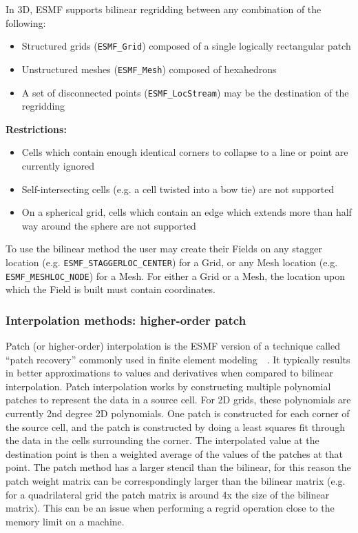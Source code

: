 \smallskip

 In 3D, ESMF supports bilinear regridding between any combination of the following:
 \begin{itemize}
 \item Structured grids ({\tt ESMF\_Grid}) composed of a single logically rectangular patch
 \item Unstructured meshes ({\tt ESMF\_Mesh}) composed of hexahedrons 
 \item A set of disconnected points ({\tt ESMF\_LocStream}) may be the destination of the regridding
 \end{itemize}

\smallskip

{\bf Restrictions:}
 \begin{itemize}
 \item Cells which contain enough identical corners to collapse to a line or point are currently ignored
 \item Self-intersecting cells (e.g. a cell twisted into a bow tie) are not supported 
 \item On a spherical grid, cells which contain an edge which extends more than half way around the sphere are not supported 
 \end{itemize}

 To use the bilinear method the user may create their Fields on any stagger location (e.g. {\tt ESMF\_STAGGERLOC\_CENTER}) for a Grid, or
 any Mesh location (e.g. {\tt ESMF\_MESHLOC\_NODE}) for a Mesh. For either a Grid or a Mesh, the location upon which the Field is built 
 must contain coordinates. 

\subsubsection{Interpolation methods: higher-order patch}\label{sec:interpolation:patch}

 Patch (or higher-order) interpolation is the ESMF version of a technique called ``patch recovery'' commonly
 used in finite element modeling~\cite{PatchInterp1}~\cite{PatchInterp2}. It typically results in better approximations to 
 values and derivatives when compared to bilinear interpolation.
 Patch interpolation works by constructing multiple polynomial patches to represent
 the data in a source cell. For 2D grids, these polynomials
 are currently 2nd degree 2D polynomials. One patch is constructed for each corner of the source cell, and the patch is constructed 
 by doing a least squares fit through the data in the cells surrounding the corner. The interpolated value at the destination point is 
 then a weighted average of the values of the patches at that point. The patch method has a larger
 stencil than the bilinear, for this reason the patch weight matrix can be correspondingly larger
 than the bilinear matrix (e.g. for a quadrilateral grid the patch matrix is around 4x the size of
 the bilinear matrix). This can be an issue when performing a regrid operation close to the memory
 limit on a machine.  

